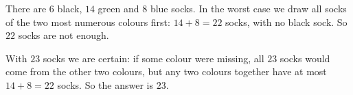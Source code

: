 There are $6$ black, $14$ green and $8$ blue socks. In the worst case we draw all socks of the two most numerous colours first: $14+8=22$ socks, with no black sock. So $22$ socks are not enough.

With $23$ socks we are certain: if some colour were missing, all $23$ socks would come from the other two colours, but any two colours together have at most $14+8=22$ socks. So the answer is $\boxed{23}$.
